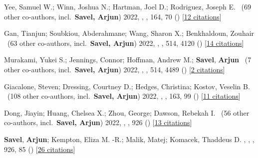 \item[{\color{numcolor}\scriptsize13}] Yee, Samuel W.; Winn, Joshua N.; Hartman, Joel D.; Rodriguez, Joseph E. \etal\ ({69} other co-authors, incl.\ \textbf{Savel, Arjun}) 2022, , \aj, {164}, 70 () [\href{https://ui.adsabs.harvard.edu/abs/2022AJ....164...70Y}{12 citations}]

\item[{\color{numcolor}\scriptsize12}] Gan, Tianjun; Soubkiou, Abderahmane; Wang, Sharon X.; Benkhaldoun, Zouhair \etal\ ({63} other co-authors, incl.\ \textbf{Savel, Arjun}) 2022, , \mnras, {514}, 4120 () [\href{https://ui.adsabs.harvard.edu/abs/2022MNRAS.514.4120G}{14 citations}]

\item[{\color{numcolor}\scriptsize11}] Murakami, Yukei S.; Jennings, Connor; Hoffman, Andrew M.; \textbf{Savel}, \textbf{Arjun} \etal\ ({7} other co-authors, incl.\ \textbf{Savel, Arjun}) 2022, , \mnras, {514}, 4489 () [\href{https://ui.adsabs.harvard.edu/abs/2022MNRAS.514.4489M}{2 citations}]

\item[{\color{numcolor}\scriptsize10}] Giacalone, Steven; Dressing, Courtney D.; Hedges, Christina; Kostov, Veselin B. \etal\ ({108} other co-authors, incl.\ \textbf{Savel, Arjun}) 2022, , \aj, {163}, 99 () [\href{https://ui.adsabs.harvard.edu/abs/2022AJ....163...99G}{11 citations}]

\item[{\color{numcolor}\scriptsize9}] Dong, Jiayin; Huang, Chelsea X.; Zhou, George; Dawson, Rebekah I. \etal\ ({56} other co-authors, incl.\ \textbf{Savel, Arjun}) 2022, , \apj, {926} () [\href{https://ui.adsabs.harvard.edu/abs/2022ApJ...926L...7D}{13 citations}]

\item[{\color{numcolor}\scriptsize8}] \textbf{Savel}, \textbf{Arjun}; Kempton, Eliza M. -R.; Malik, Matej; Komacek, Thaddeus D. , , \apj, {926}, 85 () [\href{https://ui.adsabs.harvard.edu/abs/2022ApJ...926...85S}{26 citations}]

